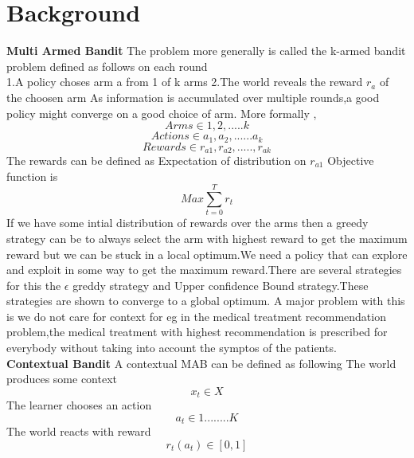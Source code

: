 \documentclass[11pt,letterpaper]{article}
\newcommand{\blue}[1]{\textcolor{RoyalBlue}{#1}}
\newcommand{\instructions}[1]{\blue{\textit{#1}}}
\renewcommand{\instructions}[1]{}
\begin{document}
\section*{Background}
\instructions{Has there been any prior work on this task? If so,
  provide references where available}
\textbf{Multi Armed Bandit}
The problem more generally is called the k-armed bandit problem defined as follows on each round \\
1.A policy choses arm a from 1 of k arms 
2.The world reveals the reward $r_a$ of the choosen arm
As information is accumulated over multiple rounds,a good policy might converge on a good choice of arm.
More formally ,
\begin{equation*}
Arms\in{1,2,.....k}
\end{equation*}
\begin{equation*}
Actions \in {a_1,a_2,......a_k}
\end{equation*}
\begin{equation*}
Rewards \in {r_{a1},r_{a2},.....,r_{ak}}
\end{equation*}
The rewards can be defined as Expectation of distribution on $r_{a1}$ 
Objective function is 
\begin{equation*}
Max \sum_{t=0}^{T} r_t 
\end{equation*}
If we have some intial distribution of rewards over the arms then a greedy strategy can be to  always select the arm with highest reward to get the maximum reward but we can be stuck in a local optimum.We need a policy that can explore and exploit in some way to get the maximum reward.There are several strategies for this the $\epsilon$ greddy strategy and Upper confidence Bound strategy.These strategies are shown to converge to a global optimum. A major problem with this is we do not care for context for eg in the medical treatment recommendation problem,the medical treatment with highest recommendation is prescribed for everybody without taking into account the symptos of the patients.\\
\textbf{Contextual Bandit} A contextual MAB can be defined as following
\cite{AnInt60:online}
\cite{Perso60:online}
	The world produces some context
	\begin{equation*}
	x_t \in X
	\end{equation*}
	The learner chooses an action
	\begin{equation*}
	a_t \in {1........K}
	\end{equation*}
	The world reacts with reward
	\begin{equation*}
	r_t(a_t) \in [0,1]
	\end{equation*}
\end{document}
